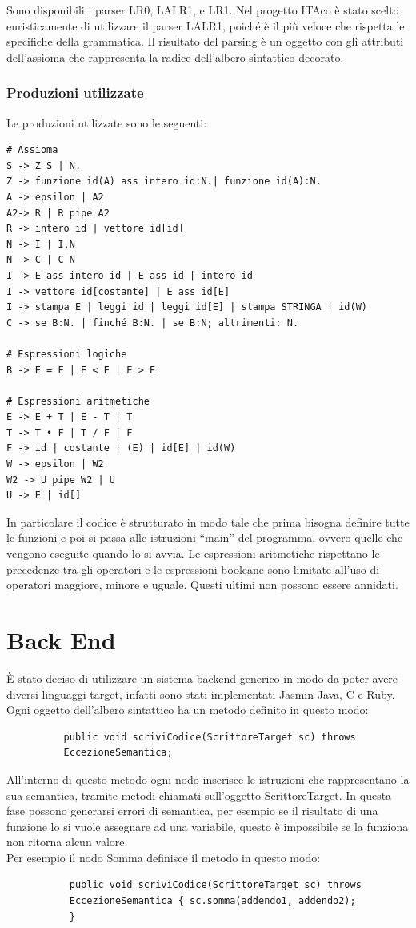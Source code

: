 \documentclass[11pt, a4paper, twoside, notitlepage]{report}
\begin{document}
Sono disponibili i parser LR0, LALR1, e LR1. Nel progetto ITAco è stato scelto
euristicamente di utilizzare il parser LALR1, poiché è il più veloce che
rispetta le specifiche della grammatica. Il risultato del parsing è un oggetto
con gli attributi dell'assioma che rappresenta la radice dell'albero sintattico
decorato.
\subsection{Produzioni utilizzate}
Le produzioni utilizzate sono le seguenti:
\begin{verbatim}
# Assioma
S -> Z S | N.
Z -> funzione id(A) ass intero id:N.| funzione id(A):N.
A -> epsilon | A2
A2-> R | R pipe A2 
R -> intero id | vettore id[id]
N -> I | I,N
N -> C | C N
I -> E ass intero id | E ass id | intero id
I -> vettore id[costante] | E ass id[E]
I -> stampa E | leggi id | leggi id[E] | stampa STRINGA | id(W)
C -> se B:N. | finché B:N. | se B:N; altrimenti: N.

# Espressioni logiche
B -> E = E | E < E | E > E

# Espressioni aritmetiche
E -> E + T | E - T | T
T -> T • F | T / F | F
F -> id | costante | (E) | id[E] | id(W)
W -> epsilon | W2
W2 -> U pipe W2 | U
U -> E | id[]
\end{verbatim}

In particolare il codice è strutturato in modo tale che prima bisogna definire
tutte le funzioni e poi si passa alle istruzioni ``main'' del programma, ovvero
quelle che vengono eseguite quando lo si avvia. Le espressioni aritmetiche
rispettano le precedenze tra gli operatori e le espressioni booleane sono
limitate all'uso di operatori maggiore, minore e uguale. Questi ultimi non
possono essere annidati.
\chapter{Back End}
\label{back_end}
È stato deciso di utilizzare un sistema backend generico in modo da poter avere
diversi linguaggi target, infatti sono stati implementati Jasmin-Java, C e Ruby.
Ogni oggetto dell'albero sintattico ha un metodo definito in questo modo:

\begin{verbatim}
          public void scriviCodice(ScrittoreTarget sc) throws
          EccezioneSemantica;
\end{verbatim}

All'interno di questo metodo ogni nodo inserisce le istruzioni che rappresentano
la sua semantica, tramite metodi chiamati sull'oggetto ScrittoreTarget. In
questa fase possono generarsi errori di semantica, per esempio se il
risultato di una funzione lo si vuole assegnare ad una variabile, questo è
impossibile se la funziona non ritorna alcun valore.
\\Per esempio il nodo Somma definisce il metodo in questo modo:
\begin{verbatim}
           public void scriviCodice(ScrittoreTarget sc) throws
           EccezioneSemantica { sc.somma(addendo1, addendo2);
           }
\end{verbatim}
 
\end{document}
